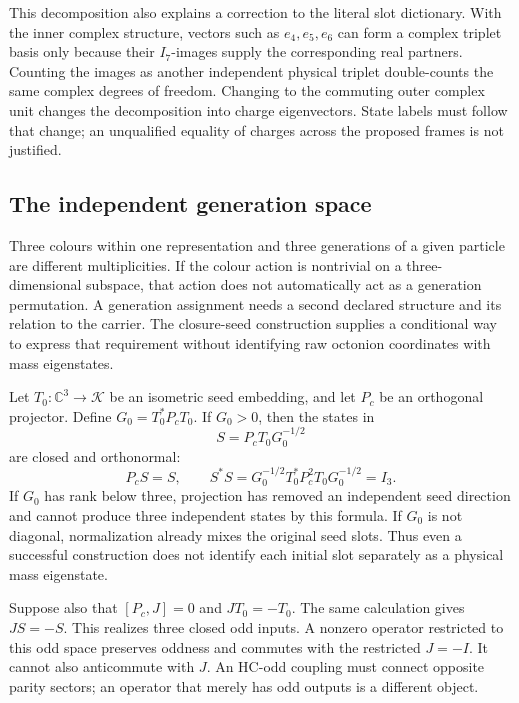 This decomposition also explains a correction to the literal slot
dictionary. With the inner complex structure, vectors such as
$e_4,e_5,e_6$ can form a complex triplet basis only because their
$I_7$-images supply the corresponding real partners. Counting the
images as another independent physical triplet double-counts the
same complex degrees of freedom. Changing to the commuting outer
complex unit changes the decomposition into charge eigenvectors.
State labels must follow that change; an unqualified equality of
charges across the proposed frames is not justified.

\subsection{The independent generation space}
Three colours within one representation and three generations of a
given particle are different multiplicities. If the colour action is
nontrivial on a three-dimensional subspace, that action does not
automatically act as a generation permutation. A generation assignment
needs a second declared structure and its relation to the carrier.
The closure-seed construction supplies a conditional way to express
that requirement without identifying raw octonion coordinates with
mass eigenstates.

Let $T_0:\mathbb C^3\to\mathcal K$ be an isometric seed embedding,
and let $P_c$ be an orthogonal projector. Define
$G_0=T_0^*P_cT_0$. If $G_0>0$, then the states in
\begin{equation}
 S=P_cT_0G_0^{-1/2}
\end{equation}
are closed and orthonormal:
\begin{equation}
 P_cS=S,\qquad
 S^*S=G_0^{-1/2}T_0^*P_c^2T_0G_0^{-1/2}=I_3.
\end{equation}
If $G_0$ has rank below three, projection has removed an independent
seed direction and cannot produce three independent states by this
formula. If $G_0$ is not diagonal, normalization already mixes the
original seed slots. Thus even a successful construction does not
identify each initial slot separately as a physical mass eigenstate.

Suppose also that $[P_c,J]=0$ and $JT_0=-T_0$. The same calculation
gives $JS=-S$. This realizes three closed odd inputs. A nonzero
operator restricted to this odd space preserves oddness and commutes
with the restricted $J=-I$. It cannot also anticommute with $J$.
An HC-odd coupling must connect opposite parity sectors; an operator
that merely has odd outputs is a different object.

